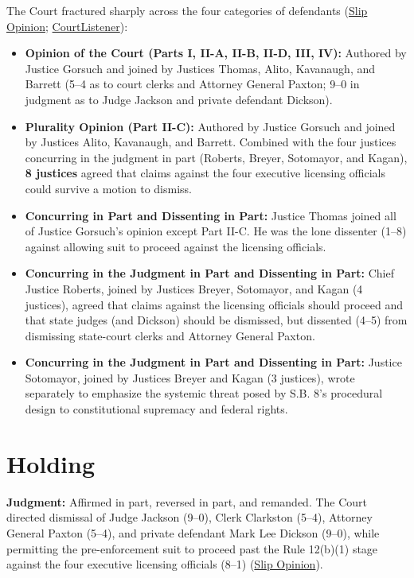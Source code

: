 \documentclass[12pt]{article}
\begin{document}
The Court fractured sharply across the four categories of defendants (\href{https://www.supremecourt.gov/opinions/21pdf/21-463_3ebh.pdf}{Slip Opinion}; \href{https://www.courtlistener.com/opinion/5305640/whole-womans-health-v-jackson/}{CourtListener}):

\begin{itemize}
    \item \textbf{Opinion of the Court (Parts I, II-A, II-B, II-D, III, IV):} Authored by Justice Gorsuch and joined by Justices Thomas, Alito, Kavanaugh, and Barrett (5--4 as to court clerks and Attorney General Paxton; 9--0 in judgment as to Judge Jackson and private defendant Dickson).
    \item \textbf{Plurality Opinion (Part II-C):} Authored by Justice Gorsuch and joined by Justices Alito, Kavanaugh, and Barrett. Combined with the four justices concurring in the judgment in part (Roberts, Breyer, Sotomayor, and Kagan), \textbf{8 justices} agreed that claims against the four executive licensing officials could survive a motion to dismiss.
    \item \textbf{Concurring in Part and Dissenting in Part:} Justice Thomas joined all of Justice Gorsuch's opinion except Part II-C. He was the lone dissenter (1--8) against allowing suit to proceed against the licensing officials.
    \item \textbf{Concurring in the Judgment in Part and Dissenting in Part:} Chief Justice Roberts, joined by Justices Breyer, Sotomayor, and Kagan (4 justices), agreed that claims against the licensing officials should proceed and that state judges (and Dickson) should be dismissed, but dissented (4--5) from dismissing state-court clerks and Attorney General Paxton.
    \item \textbf{Concurring in the Judgment in Part and Dissenting in Part:} Justice Sotomayor, joined by Justices Breyer and Kagan (3 justices), wrote separately to emphasize the systemic threat posed by S.B. 8's procedural design to constitutional supremacy and federal rights.
\end{itemize}

\section{Holding}

\textbf{Judgment:} Affirmed in part, reversed in part, and remanded. The Court directed dismissal of Judge Jackson (9--0), Clerk Clarkston (5--4), Attorney General Paxton (5--4), and private defendant Mark Lee Dickson (9--0), while permitting the pre-enforcement suit to proceed past the Rule 12(b)(1) stage against the four executive licensing officials (8--1) (\href{https://www.supremecourt.gov/opinions/21pdf/21-463_3ebh.pdf}{Slip Opinion}).
\end{document}
